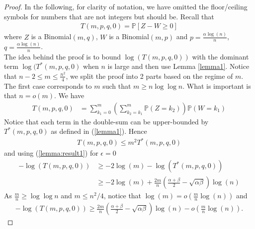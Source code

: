 \documentclass[english]{article}
\newcommand{\1}{\textbf{1}}
\newcommand{\p}{\mathbb{P}}
\begin{document}
\begin{proof}
In the following, for clarity of notation, we have omitted the floor/ceiling symbols for numbers that are not integers but should be. 
Recall that
\begin{align}
T(m,p,q,0)=\p[Z-W \geq 0]
\end{align}
where $Z$ is a Binomial$(m,q)$, $W$ is a Binomial$(m,p)$ and $p=\frac{\alpha \log(n)}{n}$, $q=\frac{\alpha \log(n)}{n}$.\\

The idea behind the proof is to bound $\log(T(m,p,q,0))$ with the dominant term $\log(T^*(m,p,q,0)$ when $n$ is large and then use Lemma \ref{lemma1}. Notice that $n-2 \leq m \leq \frac{n^2}{4}$, we split the proof into 2 parts based on the regime of $m$.\\

The first case corresponds to $m$ such that $m \geq n\log\log n$. What is important is that $n = o(m)$. We have
\begin{align}
T(m,p,q,0) &= \sum_{k_1=0}^m \left(\sum_{k_2=k_1}^m \p(Z=k_2) \right) \p(W=k_1)
\end{align}
Notice that each term in the double-sum can be upper-bounded by $T^*(m,p,q,0)$ as defined in (\ref{lemma1}). 
Hence
\begin{align}
T(m,p,q,0) \leq m^2 T^*(m,p,q,0)
\end{align}
and using (\ref{lemma:result1}) for $\epsilon=0$
\begin{align}
-\log(T(m,p,q,0)) &\geq -2\log(m) -\log(T^*(m,p,q,0))\\
& \geq -2\log(m) + \frac{2m}{n} \left( \frac{\alpha+\beta}{2} -\sqrt{\alpha \beta}\right) \log(n)
\end{align}
As $\frac{m}{n}\geq \log \log n$ and $m \leq n^2/4$, notice that $\log(m) = o\left( \frac{m}{n} \log(n) \right)$ and
\begin{align}
-\log(T(m,p,q,0))  \geq \frac{2m}{n} \left( \frac{\alpha+\beta}{2} -\sqrt{\alpha \beta}\right) \log(n) -  o\left( \frac{m}{n} \log(n) \right).
\end{align}


\end{proof}
\end{document}
